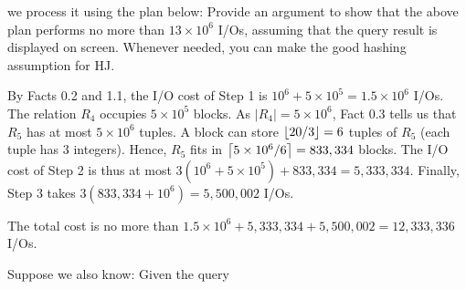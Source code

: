 we process it using the plan below:
\noindent Provide an argument to show that the above plan performs no more than $13 \times 10^6$ I/Os, assuming that the query result is displayed on screen. Whenever needed, you can make the good hashing assumption for HJ.

\begin{sol}
 By Facts 0.2 and 1.1, the I/O cost of Step 1 is $10^6 + 5 \times 10^5 = 1.5 \times 10^6$ I/Os. The relation $R_4$ occupies $5 \times 10^5$ blocks. As $|R_4| = 5 \times 10^6$, Fact 0.3 tells us that $R_5$ has at most $5 \times 10^6$ tuples. A block can store $\left \lfloor 20/3 \right \rfloor = 6$ tuples of $R_5$ (each tuple has 3 integers). Hence, $R_5$ fits in $\left \lceil 5 \times 10^6 / 6 \right \rceil = 833,334$ blocks. The I/O cost of Step 2 is thus at most $3 (10^6 + 5 \times 10^5) + 833,334 = 5,333,334$. Finally, Step 3 takes $3 (833,334 + 10^6) = 5,500,002$ I/Os.

\vgap

The total cost is no more than $1.5 \times 10^6 + 5,333,334 + 5,500,002 = 12,333,336$ I/Os.

\end{sol}

 Suppose we also know:
Given the query


